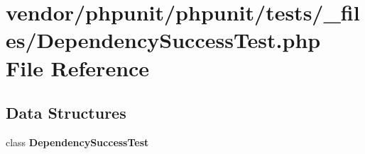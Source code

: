 \section{vendor/phpunit/phpunit/tests/\+\_\+files/\+Dependency\+Success\+Test.php File Reference}
\label{_dependency_success_test_8php}
\subsection*{Data Structures}
\begin{DoxyCompactItemize}
\item 
class {\bf Dependency\+Success\+Test}
\end{DoxyCompactItemize}
